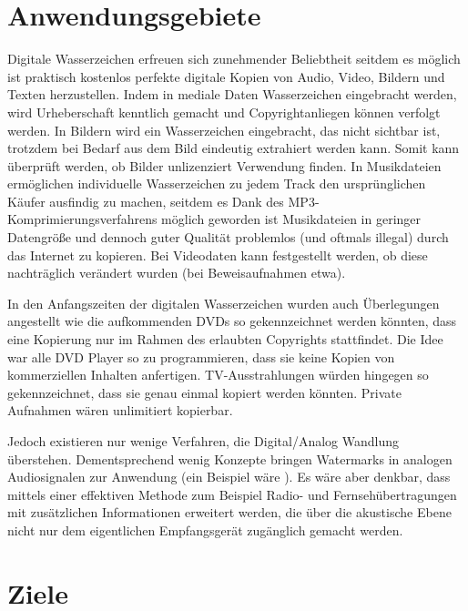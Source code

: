 \section{Anwendungsgebiete}

Digitale Wasserzeichen erfreuen sich zunehmender Beliebtheit seitdem es möglich ist praktisch kostenlos perfekte digitale Kopien von Audio, Video, Bildern und Texten herzustellen\cite{mintzer1997effective}. Indem in mediale Daten Wasserzeichen eingebracht werden, wird Urheberschaft kenntlich gemacht und Copyrightanliegen können verfolgt werden. In Bildern wird ein Wasserzeichen eingebracht, das nicht sichtbar ist, trotzdem bei Bedarf aus dem Bild eindeutig extrahiert werden kann. Somit kann überprüft werden, ob Bilder unlizenziert Verwendung finden. In Musikdateien ermöglichen individuelle Wasserzeichen zu jedem Track den ursprünglichen Käufer ausfindig zu machen, seitdem es Dank des MP3-Komprimierungsverfahrens möglich geworden ist Musikdateien in geringer Datengröße und dennoch guter Qualität problemlos (und oftmals illegal) durch das Internet zu kopieren. Bei Videodaten kann festgestellt werden, ob diese nachträglich verändert wurden (bei Beweisaufnahmen etwa). 

In den Anfangszeiten der digitalen Wasserzeichen wurden auch Überlegungen angestellt wie die aufkommenden DVDs so gekennzeichnet werden könnten, dass eine Kopierung nur im Rahmen des erlaubten Copyrights stattfindet\cite{petitcolas1999information}. Die Idee war alle DVD Player so zu programmieren, dass sie keine Kopien von kommerziellen Inhalten anfertigen. TV-Ausstrahlungen würden hingegen so gekennzeichnet, dass sie genau einmal kopiert werden könnten. Private Aufnahmen wären unlimitiert kopierbar. 

Jedoch existieren nur wenige Verfahren, die Digital/Analog Wandlung überstehen. Dementsprechend wenig Konzepte bringen Watermarks in analogen Audiosignalen zur Anwendung (ein Beispiel wäre \cite{chang2012location}). Es wäre aber denkbar, dass mittels einer effektiven Methode zum Beispiel Radio- und Fernsehübertragungen mit zusätzlichen Informationen erweitert werden, die über die akustische Ebene nicht nur dem eigentlichen Empfangsgerät zugänglich gemacht werden.

\section{Ziele}

